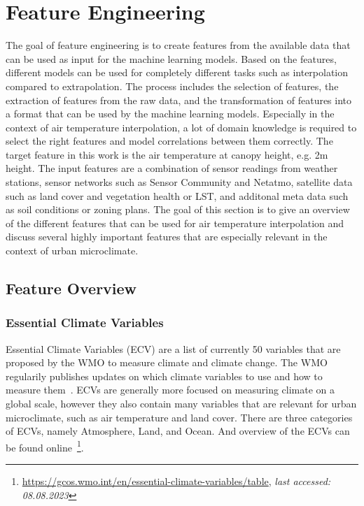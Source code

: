 \section{Feature Engineering}
\label{sec:feature_engineering}

The goal of feature engineering is to create features from the available data that can be used as input for the machine learning models. Based on the features, different models can be used for completely different tasks such as interpolation compared to extrapolation. The process includes the selection of features, the extraction of features from the raw data, and the transformation of features into a format that can be used by the machine learning models.
Especially in the context of air temperature interpolation, a lot of domain knowledge is required to select the right features and model correlations between them correctly. The target feature in this work is the air temperature at canopy height, e.g. 2m height. The input features are a combination of sensor readings from weather stations, sensor networks such as Sensor Community and Netatmo, satellite data such as land cover and vegetation health or LST, and additonal meta data such as soil conditions or zoning plans. The goal of this section is to give an overview of the different features that can be used for air temperature interpolation and discuss several highly important features that are especially relevant in the context of urban microclimate.

\subsection{Feature Overview}

\subsubsection{Essential Climate Variables}

Essential Climate Variables (ECV) are a list of currently 50 variables that are proposed by the WMO to measure climate and climate change. The WMO regularily publishes updates on which climate variables to use and how to measure them~\cite{wmo2018guide}. ECVs are generally more focused on measuring climate on a global scale, however they also contain many variables that are relevant for urban microclimate, such as air temperature and land cover. There are three categories of ECVs, namely Atmosphere, Land, and Ocean. And overview of the ECVs can be found online~\footnote{\url{https://gcos.wmo.int/en/essential-climate-variables/table}, \textit{last accessed: 08.08.2023}}.\\

